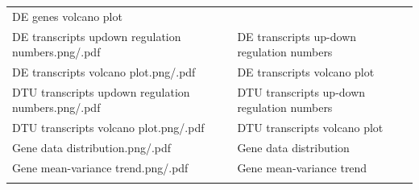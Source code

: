 \documentclass[]{article}
\begin{document}
\begin{longtable}[]{@{}ll@{}}
\begin{minipage}[t]{0.43\columnwidth}
DE genes volcano plot\strut
\end{minipage}\tabularnewline
\begin{minipage}[t]{0.51\columnwidth}\raggedright\strut
DE transcripts updown regulation numbers.png/.pdf\strut
\end{minipage} & \begin{minipage}[t]{0.43\columnwidth}\raggedright\strut
DE transcripts up-down regulation numbers\strut
\end{minipage}\tabularnewline
\begin{minipage}[t]{0.51\columnwidth}\raggedright\strut
DE transcripts volcano plot.png/.pdf\strut
\end{minipage} & \begin{minipage}[t]{0.43\columnwidth}\raggedright\strut
DE transcripts volcano plot\strut
\end{minipage}\tabularnewline
\begin{minipage}[t]{0.51\columnwidth}\raggedright\strut
DTU transcripts updown regulation numbers.png/.pdf\strut
\end{minipage} & \begin{minipage}[t]{0.43\columnwidth}\raggedright\strut
DTU transcripts up-down regulation numbers\strut
\end{minipage}\tabularnewline
\begin{minipage}[t]{0.51\columnwidth}\raggedright\strut
DTU transcripts volcano plot.png/.pdf\strut
\end{minipage} & \begin{minipage}[t]{0.43\columnwidth}\raggedright\strut
DTU transcripts volcano plot\strut
\end{minipage}\tabularnewline
\begin{minipage}[t]{0.51\columnwidth}\raggedright\strut
Gene data distribution.png/.pdf\strut
\end{minipage} & \begin{minipage}[t]{0.43\columnwidth}\raggedright\strut
Gene data distribution\strut
\end{minipage}\tabularnewline
\begin{minipage}[t]{0.51\columnwidth}\raggedright\strut
Gene mean-variance trend.png/.pdf\strut
\end{minipage} & \begin{minipage}[t]{0.43\columnwidth}\raggedright\strut
Gene mean-variance trend\strut
\end{minipage}\tabularnewline
\begin{minipage}[t]{0.51\columnwidth}\raggedright\strut

\end{minipage}
\end{longtable}
\end{document}
